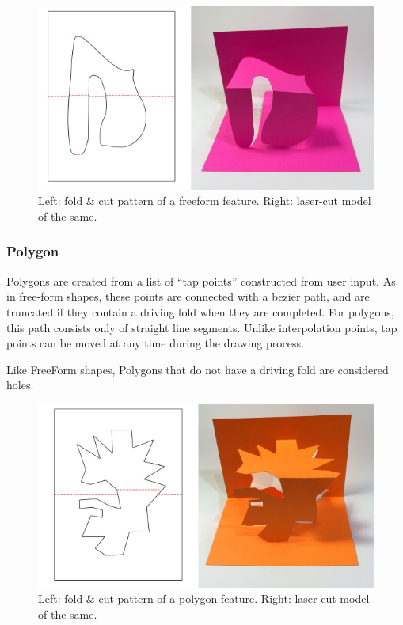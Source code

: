 \begin{figure}[htbp]
\centering
\includegraphics{figures/33_UI_Interface_Data_Structures/free.pdf}
\caption{Left: fold \& cut pattern of a freeform feature. Right:
laser-cut model of the same.}
\end{figure}

\subsubsection{Polygon}\label{polygon}

Polygons are created from a list of ``tap points'' constructed from user
input. As in free-form shapes, these points are connected with a bezier
path, and are truncated if they contain a driving fold when they are
completed. For polygons, this path consists only of straight line
segments. Unlike interpolation points, tap points can be moved at any
time during the drawing process.

Like FreeForm shapes, Polygons that do not have a driving fold are
considered holes.

\begin{figure}[htbp]
\centering
\includegraphics{figures/33_UI_Interface_Data_Structures/poly.pdf}
\caption{Left: fold \& cut pattern of a polygon feature. Right:
laser-cut model of the same.}
\end{figure}

